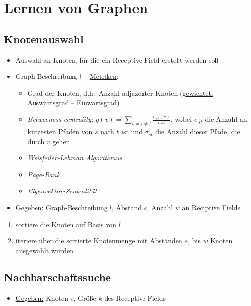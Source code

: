 \section{Lernen von Graphen}

\subsection{Knotenauswahl}

\begin{itemize}
  \item Auswahl an Knoten, für die ein Receptive Field erstellt werden soll
  \item Graph-Beschreibung $l$ – \underline{Metriken}:
  \begin{itemize}
    \item Grad der Knoten, d.h.\ Anzahl adjazenter Knoten (\underline{gewichtet:} Auswärtsgrad – Einwärtsgrad)
    \item \emph{Betweeness centrality}: $g(v) = \sum_{s \neq v \neq t} \frac{\sigma_{st}(v)}{\sigma{st}}$, wobei $\sigma_{st}$ die Anzahl an kürzesten Pfaden von $s$ nach $t$ ist und $\sigma_{st}$ die Anzahl dieser Pfade, die durch $v$ gehen
    \item \emph{Weisfeiler-Lehman Algorithmus} 
    \item \emph{Page-Rank}
    \item \emph{Eigenvektor-Zentralität}
  \end{itemize}
  \item \underline{Gegeben:} Graph-Beschreibung $l$, Abstand $s$, Anzahl $w$ an Reciptive Fields
\end{itemize}

\begin{enumerate}
  \item sortiere die Knoten auf Basis von $l$
  \item iteriere über die sortierte Knotenmenge mit Abständen $s$, bis $w$ Knoten ausgewählt wurden
\end{enumerate}

\subsection{Nachbarschaftssuche}

\begin{itemize}
  \item \underline{Gegeben:} Knoten $v$, Größe $k$ des Receptive Fields
\end{itemize}

